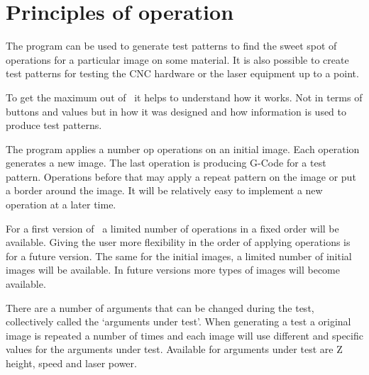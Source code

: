 \chapter{Principles of operation}\label{PrinciplesOfOperation}

The program can be used to generate test patterns to find the sweet spot of operations for a particular image on some
material. It is also possible to create test patterns for testing the CNC hardware or the laser equipment up to a point.

To get the maximum out of \GS\ it helps to understand how it works. Not in terms of buttons and values but in how it was
designed and how information is used to produce test patterns.

The program applies a number op operations on an initial image.
Each operation generates a new image. The last operation is producing G-Code for a test pattern.
Operations before that may apply a repeat pattern on the image or put a border around the image. It will be relatively
easy to implement a new operation at a later time.

For a first version of \GS\ a limited number of operations in a fixed order will be available. Giving the user more
flexibility in the order of applying operations is for a future version. The same for the initial images, a limited
number of initial images will be available. In future versions more types of images will become available.

There are a number of arguments that can be changed during the test, collectively called the
`{arguments under test}'.
When generating a test a original image is repeated a number of times and each image will use
different and specific values for the arguments under test. Available for arguments under test are Z
height, speed and
laser power.

